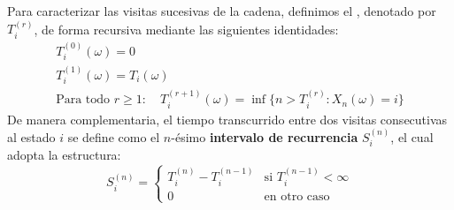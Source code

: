 \begin{definicion}
    Para caracterizar las visitas sucesivas de la cadena, definimos el , denotado por $T_i^{(r)}$, de forma recursiva mediante las siguientes identidades:
    \[
    \begin{array}{l}
        T_i^{(0)}(\omega) = 0 \\
        T_i^{(1)}(\omega) = T_i(\omega) \\
        \text{Para todo } r \geq 1: \quad T_i^{(r+1)}(\omega) = \inf\{n > T_i^{(r)} : X_n(\omega) = i\}
    \end{array}
    \]
    De manera complementaria, el tiempo transcurrido entre dos visitas consecutivas al estado $i$ se define como el $n$-ésimo \textbf{intervalo de recurrencia} $S_i^{(n)}$, el cual adopta la estructura:
    \[
    S_i^{(n)} = \begin{cases} T_i^{(n)} - T_i^{(n-1)} & \text{si } T_i^{(n-1)} < \infty \\ 0 & \text{en otro caso} \end{cases}
    \]
\end{definicion}

\vspace{0.4cm}

